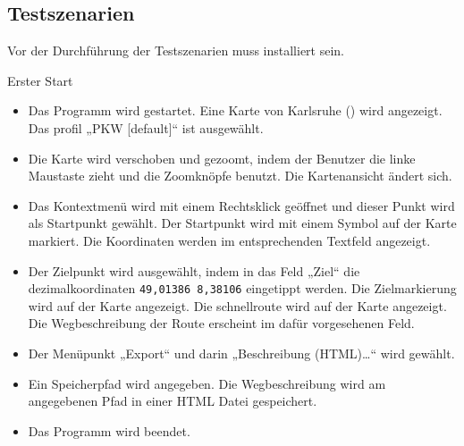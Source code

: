 \documentclass[a4paper, 11pt]{article}
\makeatletter
\def\namedlabel#1#2{\begingroup
    #2%
    \def\@currentlabel{#2}%
    \phantomsection\label{#1}\endgroup
}
\newcommand{\oitem}[2]{
  \@ifundefined{c@oitem#1}{\newcounter{oitem#1}}{} %
  \addtocounter{oitem#1}{10}
  \item[\namedlabel{#1:#2}{/#1\arabic{oitem#1}/}]
}
\makeatother
\begin{document}
\subsection{Testszenarien}
Vor der Durchführung der Testszenarien muss \routeKIT installiert sein.
\begin{description}
\oitem{TS}{ersterStart} Erster Start\\
\begin{itemize}
\item Das Programm \routeKIT wird gestartet. Eine Karte von Karlsruhe () wird angezeigt. Das \gls{profil} „PKW [default]“ ist ausgewählt.
\item Die Karte wird verschoben und gezoomt, indem der Benutzer die linke Maustaste zieht und die Zoomknöpfe benutzt. Die Kartenansicht ändert sich.
\item Das Kontextmenü wird mit einem Rechtsklick geöffnet und dieser Punkt wird als Startpunkt gewählt. Der Startpunkt wird mit einem Symbol auf der Karte markiert. Die Koordinaten werden im entsprechenden Textfeld angezeigt.
\item Der Zielpunkt wird ausgewählt, indem in das Feld „Ziel“ die \gls{dezimalkoordinaten} \texttt{49,01386 8,38106} eingetippt werden. Die Zielmarkierung wird auf der Karte angezeigt. Die \gls{schnellroute} wird auf der Karte angezeigt. Die Wegbeschreibung der Route erscheint im dafür vorgesehenen Feld. 
\item Der  Menüpunkt „Export“ und darin „Beschreibung (HTML)\ldots“ wird gewählt.
\item Ein Speicherpfad wird angegeben. Die Wegbeschreibung wird am angegebenen Pfad in einer HTML Datei gespeichert.
\item Das Programm wird beendet.
\end{itemize}



\end{description}
\end{document}
